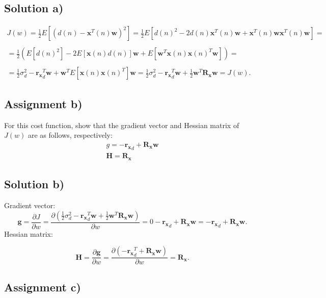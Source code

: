 \documentclass[a4paper, 12pt]{article}
\begin{document}
\subsection*{Solution a)}


$$
\begin{array}{l}
J(w) = \frac{1}{2}E[(d(n) - \mathbf{x}^T(n)\mathbf{w})^2] = \frac{1}{2}E[d(n)^2 - 2 d(n)\mathbf{x}^T(n)\mathbf{w}+\mathbf{x}^T(n)\mathbf{w}\mathbf{x}^T(n)\mathbf{w}] = \\
\\
=\frac{1}{2}(E[d(n)^2] - 2E[\mathbf{x}(n)d(n)]\mathbf{w}+E[\mathbf{w}^T\mathbf{x}(n)\mathbf{x}(n)^T\mathbf{w}]) =\\
\\
=\frac{1}{2}\sigma_d^2 - \mathbf{r_x}_d^T\mathbf{w} + \mathbf{w}^T E[\mathbf{x}(n)\mathbf{x}(n)^T] \mathbf{w} = \frac{1}{2}\sigma_d^2 - \mathbf{r_x}_d^T\mathbf{w} +\frac{1}{2}\mathbf{w}^T \mathbf{R_x} \mathbf{w} = J(w).
\end{array}
$$

\subsection*{Assignment b)}
For this cost function, show that the gradient vector and Hessian matrix of $J(w)$ are as follows, respectively:
$$
\begin{array}{l}
   g = - \mathbf{r_x}_d +\mathbf{R_x}\mathbf{w}\\
   \mathbf{H} = \mathbf{R_x}
\end{array}
$$

\subsection*{Solution b)}
Gradient vector:
\begin{equation*}
  \mathbf{g}= \frac{\partial J}{\partial w} = \frac{\partial (\frac{1}{2}\sigma_d^2 - \mathbf{r_x}_d^T\mathbf{w} +\frac{1}{2}\mathbf{w}^T \mathbf{R_x} \mathbf{w})}{\partial w} = 0-\mathbf{r_x}_d+\mathbf{R_x} \mathbf{w} =-\mathbf{r_x}_d+\mathbf{R_x} \mathbf{w} .
\end{equation*}
Hessian matrix:

\begin{equation*}
  \mathbf{H}= \frac{\partial \mathbf{g}}{\partial w} = \frac{\partial (-\mathbf{r_x}_d^T+\mathbf{R_x} \mathbf{w})}{\partial w} = \mathbf{R_x}.
\end{equation*}

\subsection*{Assignment c)}
\end{document}
